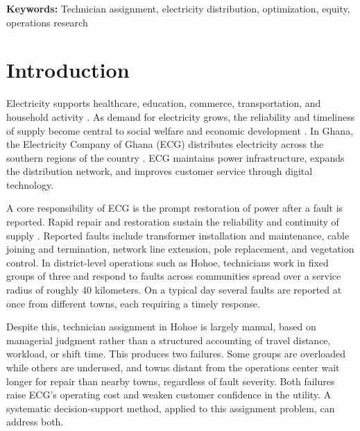 \documentclass[11pt]{article}
\begin{document}
\noindent\textbf{Keywords:}
Technician assignment, electricity distribution, optimization, equity, operations research

\newpage

\section*{Introduction}
Electricity supports healthcare, education, commerce, transportation, and household activity \cite{Modi2005,Acheampong2021}. As demand for electricity grows, the reliability and timeliness of supply become central to social welfare and economic development \cite{IEA2022,Modi2005}. In Ghana, the Electricity Company of Ghana (ECG) distributes electricity across the southern regions of the country \cite{ECG2023}. ECG maintains power infrastructure, expands the distribution network, and improves customer service through digital technology.

\vspace{0.25cm}

A core responsibility of ECG is the prompt restoration of power after a fault is reported. Rapid repair and restoration sustain the reliability and continuity of supply \cite{Brown2009,Wang2025}. Reported faults include transformer installation and maintenance, cable joining and termination, network line extension, pole replacement, and vegetation control. In district-level operations such as Hohoe, technicians work in fixed groups of three and respond to faults across communities spread over a service radius of roughly 40 kilometers. On a typical day several faults are reported at once from different towns, each requiring a timely response.

\vspace{0.25cm}
Despite this, technician assignment in Hohoe is largely manual, based on managerial judgment rather than a structured accounting of travel distance, workload, or shift time. This produces two failures. Some groups are overloaded while others are underused, and towns distant from the operations center wait longer for repair than nearby towns, regardless of fault severity. Both failures raise ECG's operating cost and weaken customer confidence in the utility. A systematic decision-support method, applied to this assignment problem, can address both.
\end{document}
